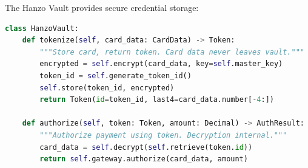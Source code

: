 The Hanzo Vault provides secure credential storage:

\begin{lstlisting}[language=Python, caption=Vault Interface]
class HanzoVault:
    def tokenize(self, card_data: CardData) -> Token:
        """Store card, return token. Card data never leaves vault."""
        encrypted = self.encrypt(card_data, key=self.master_key)
        token_id = self.generate_token_id()
        self.store(token_id, encrypted)
        return Token(id=token_id, last4=card_data.number[-4:])

    def authorize(self, token: Token, amount: Decimal) -> AuthResult:
        """Authorize payment using token. Decryption internal."""
        card_data = self.decrypt(self.retrieve(token.id))
        return self.gateway.authorize(card_data, amount)
\end{lstlisting}


